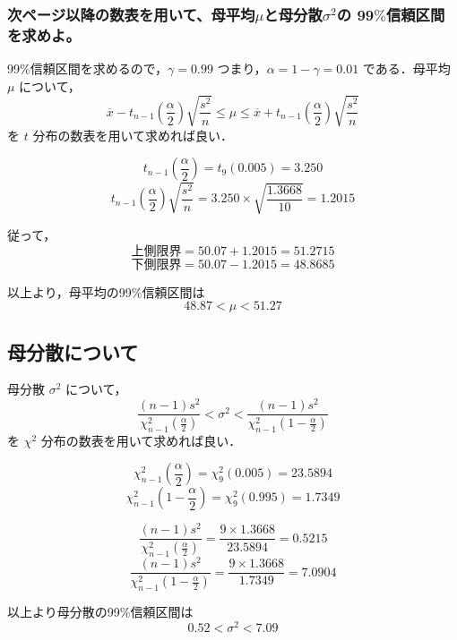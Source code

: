 \documentclass[titlepage,a4paper]{jsarticle}
\begin{document}
\subsubsection{次ページ以降の数表を用いて、母平均$\mu$と母分散$\sigma^2$の 99$\%$信頼区間を求めよ。}
99\%信頼区間を求めるので，$\gamma = 0.99$ つまり，$\alpha = 1 - \gamma = 0.01$ である．母平均 $\mu$ について，
\[
  \overline{x} - t_{n-1}\left( \frac{\alpha}{2} \right) \sqrt{\frac{s^2}{n}}
  \leq \mu \leq
  \overline{x} + t_{n-1}\left( \frac{\alpha}{2} \right) \sqrt{\frac{s^2}{n}}
\]
を $t$ 分布の数表を用いて求めれば良い．

\[
  t_{n-1}\left( \frac{\alpha}{2} \right) = t_9(0.005) = 3.250
\]
\[
  t_{n-1}\left( \frac{\alpha}{2} \right) \sqrt{\frac{s^2}{n}}
  = 3.250 \times \sqrt{\frac{1.3668}{10}} = 1.2015
\]

従って，
\[
  \text{上側限界} = 50.07 + 1.2015 = 51.2715
\]
\[
  \text{下側限界} = 50.07 - 1.2015 = 48.8685
\]

以上より，母平均の99\%信頼区間は
\[
  48.87 < \mu < 51.27
\]

\subsection*{母分散について}
母分散 $\sigma^2$ について，
\[
  \frac{(n-1)s^2}{\chi^2_{n-1}\left( \frac{\alpha}{2} \right)}
  < \sigma^2 <
  \frac{(n-1)s^2}{\chi^2_{n-1}\left( 1 - \frac{\alpha}{2} \right)}
\]
を $\chi^2$ 分布の数表を用いて求めれば良い．

\[
  \chi^2_{n-1}\left( \frac{\alpha}{2} \right) = \chi^2_9(0.005) = 23.5894
\]
\[
  \chi^2_{n-1}\left( 1 - \frac{\alpha}{2} \right) = \chi^2_9(0.995) = 1.7349
\]

\[
  \frac{(n-1)s^2}{\chi^2_{n-1}\left( \frac{\alpha}{2} \right)}
  = \frac{9 \times 1.3668}{23.5894} = 0.5215
\]
\[
  \frac{(n-1)s^2}{\chi^2_{n-1}\left( 1 - \frac{\alpha}{2} \right)}
  = \frac{9 \times 1.3668}{1.7349} = 7.0904
\]

以上より母分散の99\%信頼区間は
\[
  0.52 < \sigma^2 < 7.09
\]
\end{document}
